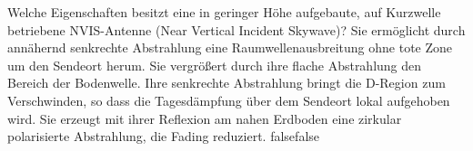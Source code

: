    {Welche Eigenschaften besitzt eine in geringer Höhe aufgebaute, auf Kurzwelle betriebene NVIS-Antenne (Near Vertical Incident Skywave)?}
    {Sie ermöglicht durch annähernd senkrechte Abstrahlung eine Raumwellenausbreitung ohne tote Zone um den Sendeort herum.}
    {Sie vergrößert durch ihre flache Abstrahlung den Bereich der Bodenwelle.}
    {Ihre senkrechte Abstrahlung bringt die D-Region zum Verschwinden, so dass die Tagesdämpfung über dem Sendeort lokal aufgehoben wird.}
    {Sie erzeugt mit ihrer Reflexion am nahen Erdboden eine zirkular polarisierte Abstrahlung, die Fading reduziert.}
    {false}{false}